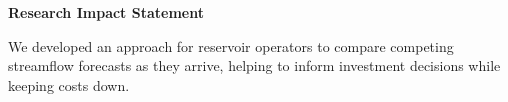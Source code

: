 \documentclass[a4paper]{article}
\begin{document}

\textbf{Research Impact Statement}

We developed an approach for reservoir operators to compare competing streamflow forecasts as they arrive, helping to inform investment decisions while keeping costs down.
\end{document}
